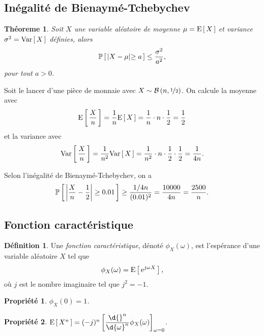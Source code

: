 \documentclass[11pt]{article}
\makeatletter
\renewcommand\P[1]{%
	\ensuremath{%
		\mathbb{P}\left[\,#1\,\right]%
	}%
}%
\newcommand\e{%
	\ensuremath{%
		\mathrm{e}%
	}%
}%
\newcommand\Bin[2]{%
	\ensuremath{%
		\mathcal{B}\left(#1,#2\right)%
	}%
}%
\newcommand\Esp[1]{%
	\ensuremath{%
		\mathrm{E}\left[\,#1\,\right]%
	}%
}%
\newcommand\Var[1]{%
	\ensuremath{%
		\mathrm{Var}\left[\,#1\,\right]%
	}%
}%
\newtheorem{theoreme}{Théoreme}[section]
\newtheorem{property}{Propriété}
\theoremstyle{remark}
\theoremstyle{definition}
\newtheorem*{@definition}{Définition}
\newenvironment{definition}{%
	\begin{@definition}%
}{%
	\end{@definition}%
	\setcounter{property}{0}%
}
\makeatother
\begin{document}
\subsection{Inégalité de Bienaymé-Tchebychev}
\begin{theoreme}
	Soit $X$ une variable aléatoire de moyenne $\mu=\Esp{X}$ et variance
	$\sigma^2=\Var{X}$ définies, alors
	\begin{equation*}
		\P{\middle|X-\mu\middle|\geq a}\leq\frac{\sigma^2}{a^2},
	\end{equation*}
	pour tout $a>0$.
\end{theoreme}

\begin{exemple}
	Soit le lancer d'une pièce de monnaie avec $X\sim\Bin{n}{\nicefrac{1}{2}}$.
	On calcule la moyenne avec
	\begin{equation*}
		\Esp{\frac{X}{n}}
		=\frac{1}{n}\Esp{X}
		=\frac{1}{n}\cdot n\cdot\frac{1}{2}
		=\frac{1}{2}
	\end{equation*}
	et la variance avec
	\begin{equation*}
		\Var{\frac{X}{n}}
		=\frac{1}{n^2}\Var{X}
		=\frac{1}{n^2}\cdot n\cdot\frac{1}{2}\cdot\frac{1}{2}
		=\frac{1}{4n}.
	\end{equation*}

	Selon l'inégalité de Bienaymé-Tchebychev, on a
	\begin{equation*}
		\P{\left|\frac{X}{n}-\frac{1}{2}\right|\geq 0.01}
		\geq\frac{1/4n}{(0.01)^2}
		=\frac{10000}{4n}
		=\frac{2500}{n}.
	\end{equation*}
\end{exemple}

\subsection{Fonction caractéristique}
\begin{definition}
	Une \textit{fonction caractéristique}, dénoté $\phi_X(\omega)$, est
	l'espérance d'une variable aléatoire $X$ tel que
	\begin{equation*}
		\phi_X(\omega)=\Esp{\e^{j\omega X}},
	\end{equation*}
	où $j$ est le nombre imaginaire tel que $j^2=-1$.
\end{definition}

\begin{property}
	$\phi_X(0)=1$.
\end{property}

\begin{property}
	$\Esp{X^n}=(-j)^n\left[
	\dfrac{\d{}^n}{\d{\omega}^n}\phi_X(\omega)\right]_{\omega=0}$.
\end{property}
\end{document}
